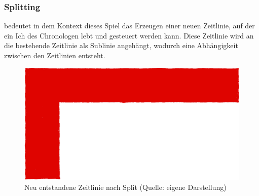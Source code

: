 \subsubsection{Splitting}\label{sec:split}
 bedeutet in dem Kontext dieses Spiel das Erzeugen einer neuen Zeitlinie, auf der ein Ich des Chronologen lebt und gesteuert werden kann. Diese Zeitlinie wird an die bestehende Zeitlinie als Sublinie angehängt, wodurch eine Abhängigkeit zwischen den Zeitlinien entsteht.

\begin{figure}[ht]
\centering
\includegraphics[width=0.5\linewidth]{content/pictures/Split.jpg}
\caption{Neu entstandene Zeitlinie nach Split (Quelle: eigene Darstellung)}
\label{fig:split}
\end{figure}

